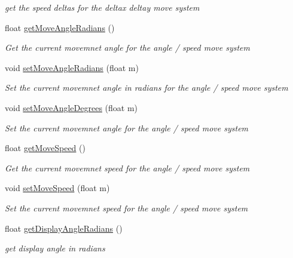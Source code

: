 \begin{DoxyCompactItemize}
\begin{DoxyCompactList}\small\item\em get the speed deltas for the deltax deltay move system \end{DoxyCompactList}\item 
float \mbox{\hyperlink{class_r_c___framework_1_1_sprite3_a71a24dd1eb93a65918e2b1db390a5546}{get\+Move\+Angle\+Radians}} ()
\begin{DoxyCompactList}\small\item\em Get the current movemnet angle for the angle / speed move system \end{DoxyCompactList}\item 
void \mbox{\hyperlink{class_r_c___framework_1_1_sprite3_a323f04ef41bc129dee67fa3b4a5cab42}{set\+Move\+Angle\+Radians}} (float m)
\begin{DoxyCompactList}\small\item\em Set the current movemnet angle in radians for the angle / speed move system \end{DoxyCompactList}\item 
void \mbox{\hyperlink{class_r_c___framework_1_1_sprite3_a6704e7b0ad3c2b828975cfe1c9cf73a3}{set\+Move\+Angle\+Degrees}} (float m)
\begin{DoxyCompactList}\small\item\em Set the current movemnet angle for the angle / speed move system \end{DoxyCompactList}\item 
float \mbox{\hyperlink{class_r_c___framework_1_1_sprite3_a1534ae3b4f4a7b075661e0d644d589cf}{get\+Move\+Speed}} ()
\begin{DoxyCompactList}\small\item\em Get the current movemnet speed for the angle / speed move system \end{DoxyCompactList}\item 
void \mbox{\hyperlink{class_r_c___framework_1_1_sprite3_a630b8d8f2eda0fc820bf76a2c65f0671}{set\+Move\+Speed}} (float m)
\begin{DoxyCompactList}\small\item\em Set the current movemnet speed for the angle / speed move system \end{DoxyCompactList}\item 
float \mbox{\hyperlink{class_r_c___framework_1_1_sprite3_a7f311c885100d7a2164549158d90d927}{get\+Display\+Angle\+Radians}} ()
\begin{DoxyCompactList}\small\item\em get display angle in radians \end{DoxyCompactList}\item 

\end{DoxyCompactItemize}
